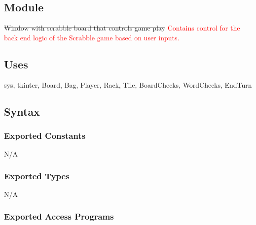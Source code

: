 \documentclass[12pt]{article}
\begin{document}
\subsection*{Module}

\sout{Window with scrabble board that controls game play} \textcolor{red}{Contains control for the back end logic of the Scrabble game based on user inputs.}

\subsection*{Uses}

\sout{sys}, tkinter, Board, Bag, Player, Rack, Tile, BoardChecks, WordChecks, EndTurn


\subsection*{Syntax}

\subsubsection*{Exported Constants}
N/A
\subsubsection*{Exported Types}

N/A

\subsubsection* {Exported Access Programs}
\end{document}
